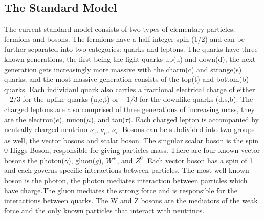 
\subsection{The Standard Model}
\label{subsec:std_model}
The current standard model consists of two types of elementary particles: fermions and bosons. The fermions have a half-integer spin (1/2) and can be further separated into two categories: quarks and leptons. The quarks have three known generations, the first being the light quarks up(u) and down(d), the next generation gets increasingly more massive with the charm(c) and strange(s) quarks, and the most massive generation consists of the top(t) and bottom(b) quarks. Each individaul quark also carries a fractional electrical charge of either $+2/3$ for the uplike quarks (u,c,t)  or $-1/3$ for the downlike quarks (d,s,b). The charged leptons are also comprised of three generations of increasing mass, they are the electron($e$), muon($\mu$), and tau($\tau$). Each charged lepton is accompanied by neutrally charged  neutrino $\nu_e , \, \nu_\mu , \, \nu_\tau$. Bosons can be subdivided into two groups as well, the vector bosons and scalar boson. The singular scalar boson is the spin 0 Higgs Boson,  responsible for giving particles mass. There are four known vector bosons the photon($\gamma$), gluon($g$), $W^\pm$, and $Z^0$.  Each  vector boson has a spin of 1 and each governs specific interactions between particles. The most well known boson is the photon, the photon mediates interaction between particles which have charge.The gluon mediates the strong force and is responsible for the interactions between quarks. The W and Z bosons are the mediators of the weak force and the only known particles that interact with neutrinos.

